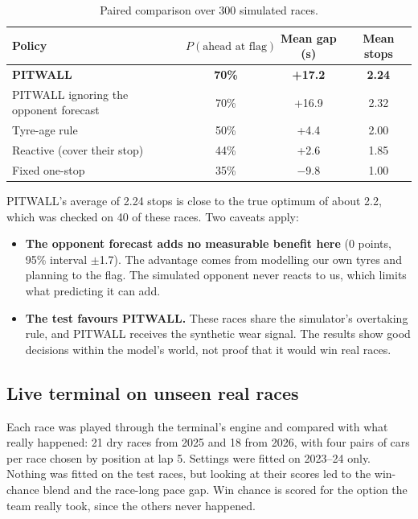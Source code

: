 \documentclass[11pt,a4paper]{article}
\begin{document}
\begin{table}[H]
\centering
\begin{tabular}{@{}lccc@{}}
\toprule
Policy & $P(\text{ahead at flag})$ & Mean gap (s) & Mean stops \\
\midrule
\textbf{PITWALL} & \textbf{70\%} & \textbf{+17.2} & \textbf{2.24} \\
PITWALL ignoring the opponent forecast & 70\% & +16.9 & 2.32 \\
Tyre-age rule & 50\% & +4.4 & 2.00 \\
Reactive (cover their stop) & 44\% & +2.6 & 1.85 \\
Fixed one-stop & 35\% & $-$9.8 & 1.00 \\
\bottomrule
\end{tabular}
\caption{Paired comparison over 300 simulated races.}
\end{table}

PITWALL's average of 2.24 stops is close to the true optimum of about 2.2, which was checked
on 40 of these races. Two caveats apply:
\begin{itemize}
  \item \textbf{The opponent forecast adds no measurable benefit here} (0 points, 95\%
        interval $\pm$1.7). The advantage comes from modelling our own tyres and planning
        to the flag. The simulated opponent never reacts to us, which limits what predicting
        it can add.
  \item \textbf{The test favours PITWALL.} These races share the simulator's overtaking
        rule, and PITWALL receives the synthetic wear signal. The results show good decisions
        within the model's world, not proof that it would win real races.
\end{itemize}

\subsection{Live terminal on unseen real races}
Each race was played through the terminal's engine and compared with what really happened:
21 dry races from 2025 and 18 from 2026, with four pairs of cars per race chosen by position
at lap 5. Settings were fitted on 2023--24 only. Nothing was fitted on the test races, but
looking at their scores led to the win-chance blend and the race-long pace gap. Win chance
is scored for the option the team really took, since the others never happened.
\end{document}
